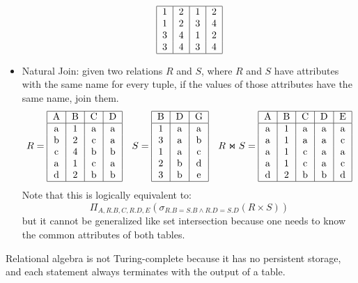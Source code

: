 \documentclass{math}
\begin{document}
\begin{itemize}
\[\begin{tabular}{|c|c|c|c|}
      \hline
      1 & 2 & 1 & 2 \\
      1 & 2 & 3 & 4 \\
      3 & 4 & 1 & 2 \\
      3 & 4 & 3 & 4 \\
      \hline
    \end{tabular} \]
  \item Natural Join: given two relations \( R \) and \( S \), where \( R \) and
    \( S \) have attributes with the same name for every tuple, if the values
    of those attributes have the same name, join them.
    \[ R = \begin{tabular}{|c|c|c|c|}
      \hline
      A & B & C & D \\
      \hline
      a & 1 & a & a \\
      b & 2 & c & a \\
      c & 4 & b & b \\
      a & 1 & c & a \\
      d & 2 & b & b \\
      \hline
    \end{tabular} \quad
    S = \begin{tabular}{|c|c|c|}
      \hline
      B & D & G \\
      \hline
      1 & a & a \\
      3 & a & b \\
      1 & a & c \\
      2 & b & d \\
      3 & b & e \\
      \hline
    \end{tabular} \quad
    R \Join S = \begin{tabular}{|c|c|c|c|c|}
      \hline
      A & B & C & D & E \\
      \hline
      a & 1 & a & a & a \\
      a & 1 & a & a & c \\
      a & 1 & c & a & a \\
      a & 1 & c & a & c \\
      d & 2 & b & b & d \\
      \hline
    \end{tabular} \]
    Note that this is logically equivalent to:
    \[ \Pi_{A,R.B,C,R.D,E}(\sigma_{R.B=S.B\wedge R.D=S.D}(R\times S)) \]
    but it cannot be generalized like set intersection because one needs to know
    the common attributes of both tables.
\end{itemize}
Relational algebra is not Turing-complete because it has no persistent storage,
and each statement always terminates with the output of a table.
\end{document}
